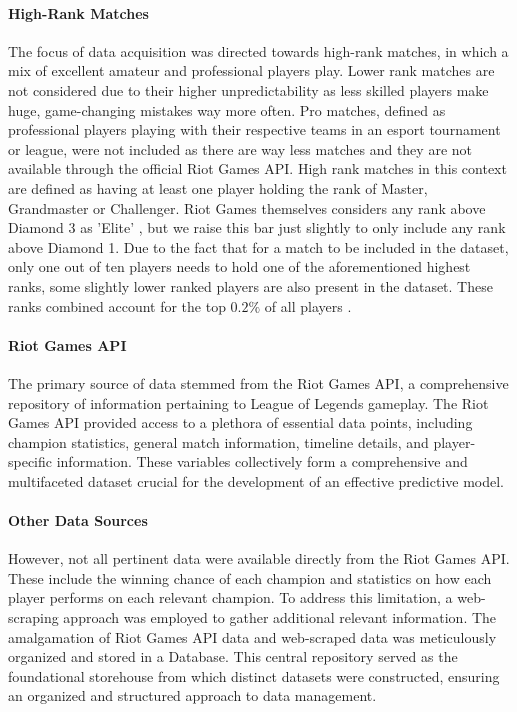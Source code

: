 \documentclass[12pt, a4paper, headinclude, twoside, plainheadsepline, open=right, numbers=noenddot, hidelinks, toc=listof, toc=bibliography]{scrreprt}
\begin{document}
\paragraph{High-Rank Matches}
The focus of data acquisition was directed towards high-rank matches, in which a mix of excellent amateur and professional players play.
Lower rank matches are not considered due to their higher unpredictability as less skilled players make huge, game-changing mistakes way more often.
Pro matches, defined as professional players playing with their respective teams in an esport tournament or league, were not included as there are way less matches and they are not available through the official Riot Games API.
High rank matches in this context are defined as having at least one player holding the rank of Master, Grandmaster or Challenger.
Riot Games themselves considers any rank above Diamond 3 as 'Elite' \cite{riotgamesDevBalanceFramework2020}, but we raise this bar just slightly to only include any rank above Diamond 1.
Due to the fact that for a match to be included in the dataset, only one out of ten players needs to hold one of the aforementioned highest ranks, some slightly lower ranked players are also present in the dataset.
These ranks combined account for the top $0.2\%$ of all players \cite{riotgamesRankedTiersDivisions2023}.
\paragraph{Riot Games API}
The primary source of data stemmed from the Riot Games API, a comprehensive repository of information pertaining to League of Legends gameplay.
The Riot Games API provided access to a plethora of essential data points, including champion statistics, general match information, timeline details, and player-specific information.
These variables collectively form a comprehensive and multifaceted dataset crucial for the development of an effective predictive model.
\paragraph{Other Data Sources}
However, not all pertinent data were available directly from the Riot Games API.
These include the winning chance of each champion and statistics on how each player performs on each relevant champion.
To address this limitation, a web-scraping approach was employed to gather additional relevant information. The amalgamation of Riot Games API data and web-scraped data was meticulously organized and stored in a Database.
This central repository served as the foundational storehouse from which distinct datasets were constructed, ensuring an organized and structured approach to data management.
\end{document}
